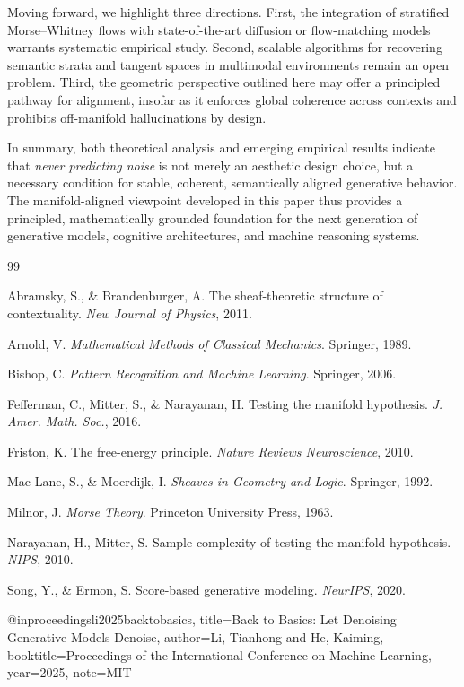\documentclass[11pt,a4paper,twocolumn]{article}
\begin{document}
Moving forward, we highlight three directions.
First, the integration of stratified Morse--Whitney flows with
state-of-the-art diffusion or flow-matching models warrants
systematic empirical study.
Second, scalable algorithms for recovering semantic strata and
tangent spaces in multimodal environments remain an open problem.
Third, the geometric perspective outlined here may offer a principled
pathway for alignment, insofar as it enforces global coherence across
contexts and prohibits off-manifold hallucinations by design.

In summary, both theoretical analysis and emerging empirical results
indicate that \emph{never predicting noise} is not merely an aesthetic
design choice, but a necessary condition for stable, coherent,
semantically aligned generative behavior.
The manifold-aligned viewpoint developed in this paper thus provides
a principled, mathematically grounded foundation for the next
generation of generative models, cognitive architectures, and
machine reasoning systems.



\begin{thebibliography}{99}

Abramsky, S., \& Brandenburger, A.  
\newblock The sheaf-theoretic structure of contextuality.  
\newblock \emph{New Journal of Physics}, 2011.

Arnold, V.  
\newblock \emph{Mathematical Methods of Classical Mechanics}.  
\newblock Springer, 1989.

Bishop, C.  
\newblock \emph{Pattern Recognition and Machine Learning}.  
\newblock Springer, 2006.

Fefferman, C., Mitter, S., \& Narayanan, H.  
\newblock Testing the manifold hypothesis.  
\newblock \emph{J. Amer. Math. Soc.}, 2016.

Friston, K.  
\newblock The free-energy principle.  
\newblock \emph{Nature Reviews Neuroscience}, 2010.

Mac Lane, S., \& Moerdijk, I.  
\newblock \emph{Sheaves in Geometry and Logic}.  
\newblock Springer, 1992.

Milnor, J.  
\newblock \emph{Morse Theory}.  
\newblock Princeton University Press, 1963.

Narayanan, H., Mitter, S.  
\newblock Sample complexity of testing the manifold hypothesis.  
\newblock \emph{NIPS}, 2010.

Song, Y., \& Ermon, S.  
\newblock Score-based generative modeling.  
\newblock \emph{NeurIPS}, 2020.

@inproceedings{li2025backtobasics,
  title={Back to Basics: Let Denoising Generative Models Denoise},
  author={Li, Tianhong and He, Kaiming},
  booktitle={Proceedings of the International Conference on Machine Learning},
  year={2025},
  note={MIT}
}

\end{thebibliography}
\end{document}
